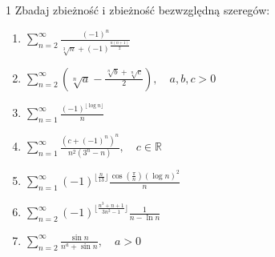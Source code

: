 \documentclass{../note}
\begin{document}
\begin{zadanie}{1}
Zbadaj zbieżność i zbieżność bezwzględną szeregów:
\begin{enumerate}
    \item[(a)] $ \sum_{n=2}^{\infty}\frac{(-1)^{n}}{\sqrt[3]{n}+(-1)^{\frac{n(n+1)}{2}}} $
    \item[(b)] $ \sum_{n=2}^{\infty}\left(\sqrt[n]{a}-\frac{\sqrt[n]{b}+\sqrt[n]{c}}{2}\right), \quad a, b, c > 0 $
    \item[(c)] $ \sum_{n=1}^{\infty}\frac{(-1)^{\lfloor \log n\rfloor}}{n} $
    \item[(d)] $ \sum_{n=1}^{\infty}\frac{(c+(-1)^{n})^{n}}{n^{2}(3^{n}-n)}, \quad c \in \mathbb{R} $
    \item[(e)] $ \sum_{n=1}^{\infty}(-1)^{\lfloor\frac{n}{13}\rfloor}\frac{\cos(\frac{\pi}{n})(\log n)^{2}}{n} $
    \item[(f)] $ \sum_{n=2}^{\infty}(-1)^{\lfloor\frac{n^{3}+n+1}{3n^{2}-1}\rfloor}\frac{1}{n-\ln n} $
    \item[(g)] $ \sum_{n=2}^{\infty}\frac{\sin n}{n^{a}+\sin n}, \quad a > 0 $
\end{enumerate}
\end{zadanie}
\end{document}
